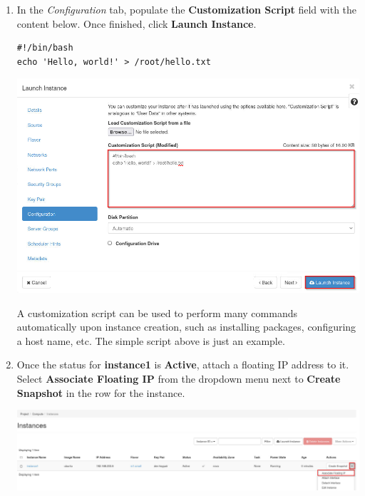 \documentclass[letterpaper, 12pt]{article}
\begin{document}
\begin{enumerate}
    \item In the \textit{Configuration} tab, populate the \textbf{Customization Script} field with the content below.
    Once finished, click \textbf{Launch Instance}.
\begin{lstlisting}
#!/bin/bash
echo 'Hello, world!' > /root/hello.txt
\end{lstlisting}

    \begin{center}
        \includegraphics[width=\linewidth]{images/part1/step26.png}
    \end{center}

    \begin{tipbox}
        A customization script can be used to perform many commands automatically upon instance creation, such as
        installing packages, configuring a host name, etc. The simple script above is just an example.
    \end{tipbox}

    \item Once the status for \textbf{instance1} is \textbf{Active}, attach a floating IP address to it. Select
    \textbf{Associate Floating IP} from the dropdown menu next to \textbf{Create Snapshot} in the row for the instance.

    \begin{center}
        \includegraphics[width=\linewidth]{images/part1/step27.png}
    \end{center}


\end{enumerate}
\end{document}
